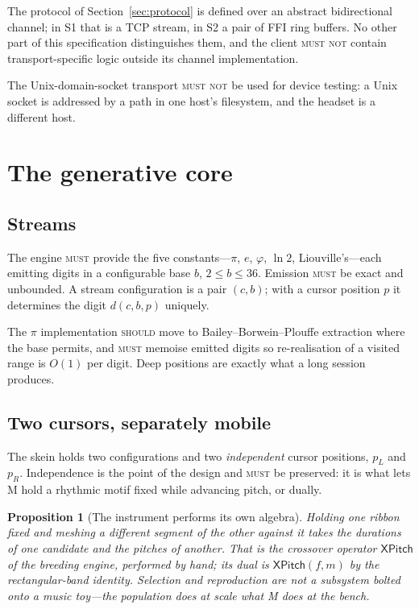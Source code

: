 \documentclass[11pt,a4paper]{article}
\newcommand{\MUST}{\textsc{must}}
\newcommand{\MUSTNOT}{\textsc{must not}}
\newcommand{\SHOULD}{\textsc{should}}
\theoremstyle{definition}
\theoremstyle{plain}
\newtheorem{proposition}{Proposition}
\theoremstyle{remark}
\begin{document}
The protocol of Section~\ref{sec:protocol} is defined over an abstract bidirectional channel; in S1
that is a TCP stream, in S2 a pair of FFI ring buffers. No other part of this specification
distinguishes them, and the client \MUSTNOT{} contain transport-specific logic outside its channel
implementation.

The Unix-domain-socket transport \MUSTNOT{} be used for device testing: a Unix socket is addressed
by a path in one host's filesystem, and the headset is a different host.

\section{The generative core}

\subsection{Streams}

The engine \MUST{} provide the five constants---$\pi$, $e$, $\varphi$, $\ln 2$, Liouville's---each
emitting digits in a configurable base $b$, $2 \le b \le 36$. Emission \MUST{} be exact and
unbounded. A stream configuration is a pair $(c,b)$; with a cursor position $p$ it determines the
digit $d(c,b,p)$ uniquely.

The $\pi$ implementation \SHOULD{} move to Bailey--Borwein--Plouffe extraction where the base
permits, and \MUST{} memoise emitted digits so re-realisation of a visited range is $O(1)$ per
digit. Deep positions are exactly what a long session produces.

\subsection{Two cursors, separately mobile}

The skein holds two configurations and two \emph{independent} cursor positions, $p_L$ and $p_R$.
Independence is the point of the design and \MUST{} be preserved: it is what lets M hold a rhythmic
motif fixed while advancing pitch, or dually.

\begin{proposition}[The instrument performs its own algebra]
Holding one ribbon fixed and meshing a different segment of the other against it takes the
durations of one candidate and the pitches of another. That is the crossover operator
$\mathsf{XPitch}$ of the breeding engine, performed by hand; its dual is
$\mathsf{XPitch}(f,m)$ by the rectangular-band identity. Selection and reproduction are not a
subsystem bolted onto a music toy---the population does at scale what M does at the bench.
\end{proposition}
\end{document}
